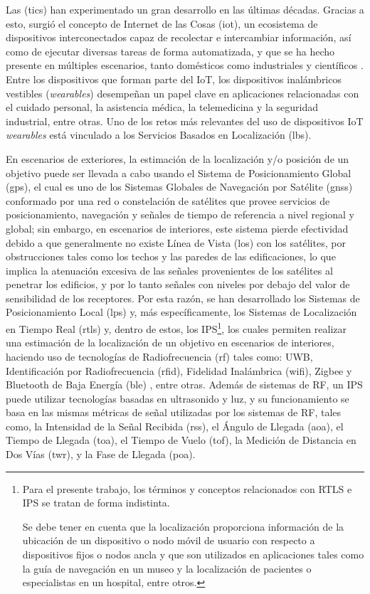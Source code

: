 Las (\gls{tics}) han experimentado un gran desarrollo en las últimas décadas. Gracias a esto, surgió el concepto de Internet de las Cosas (\gls{iot}), un ecosistema de dispositivos interconectados capaz de recolectar e intercambiar información, así como de ejecutar diversas tareas de forma automatizada, y que se ha hecho presente en múltiples escenarios, tanto domésticos como industriales y científicos \cite{ref1, ref2}. Entre los dispositivos que forman parte del IoT, los dispositivos inalámbricos vestibles (\textit{wearables}) desempeñan un papel clave en aplicaciones relacionadas con el cuidado personal, la asistencia médica, la telemedicina y la seguridad industrial, entre otras. Uno de los retos más relevantes del uso de dispositivos IoT \textit{wearables} está vinculado a los Servicios Basados en Localización (\gls{lbs}).

En escenarios de exteriores, la estimación de la localización y/o posición de un objetivo puede ser llevada a cabo usando el Sistema de Posicionamiento Global (\gls{gps}), el cual es uno de los Sistemas Globales de Navegación por Satélite (\gls{gnss}) conformado por una red o constelación de satélites que provee servicios de posicionamiento, navegación y señales de tiempo de referencia a nivel regional y global; sin embargo, en escenarios de interiores, este sistema pierde efectividad debido a que generalmente no existe Línea de Vista (\gls{los}) con los satélites, por obstrucciones tales como los techos y las paredes de las edificaciones, lo que implica la atenuación excesiva de las señales provenientes de los satélites al penetrar los edificios, y por lo tanto señales con niveles por debajo del valor de sensibilidad de los receptores. Por esta razón, se han desarrollado los Sistemas de Posicionamiento Local (\gls{lps}) y, más específicamente, los Sistemas de Localización en Tiempo Real  (\gls{rtls}) y, dentro de estos, los IPS\footnote{Para el presente trabajo, los términos y conceptos relacionados con RTLS e IPS se tratan de forma indistinta.

%
Se debe tener en cuenta que la localización proporciona información de la ubicación de un dispositivo o nodo móvil de usuario con respecto a dispositivos fijos o nodos ancla y que son utilizados en aplicaciones tales como la guía de navegación en un museo y la localización de pacientes o especialistas en un hospital, entre otros.}, los cuales permiten realizar una estimación de la localización de un objetivo en escenarios de interiores, haciendo uso de tecnologías de Radiofrecuencia (\gls{rf}) tales como: UWB, Identificación por Radiofrecuencia (\gls{rfid}), Fidelidad Inalámbrica (\gls{wifi}), Zigbee y Bluetooth de Baja Energía (\gls{ble}) \cite{ref6}, entre otras. Además de sistemas de RF, un IPS puede utilizar tecnologías basadas en ultrasonido y luz, y su funcionamiento se basa en las mismas métricas de señal utilizadas por los sistemas de RF, tales como, la Intensidad de la Señal Recibida (\gls{rss}), el Ángulo de Llegada (\gls{aoa}), el Tiempo de Llegada (\gls{toa}), el Tiempo de Vuelo (\gls{tof}), la Medición de Distancia en Dos Vías (\gls{twr}), y la Fase de Llegada (\gls{poa}).

